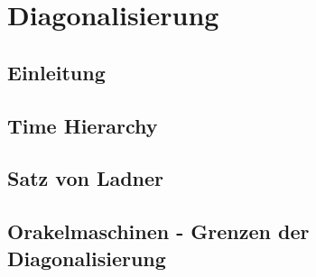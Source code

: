 \section{Diagonalisierung}
\subsection[Einleitung]{Einleitung}

\subsection[Time Hierarchy]{Time Hierarchy}

\subsection[Satz von Ladner]{Satz von Ladner}

\subsection[Orakelmaschinen]{Orakelmaschinen - Grenzen der Diagonalisierung}
